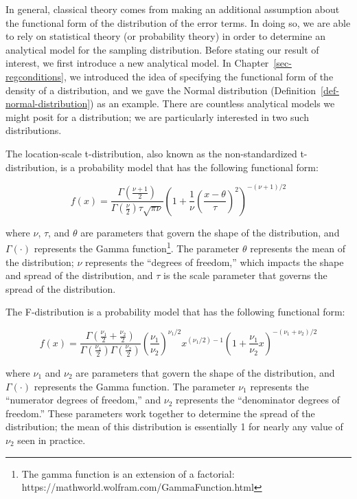 \documentclass[
  letterpaper,
  DIV=11,
  numbers=noendperiod]{scrreprt}
\theoremstyle{definition}
\theoremstyle{definition}
\theoremstyle{plain}
\theoremstyle{remark}
\begin{document}
In general, classical theory comes from making an additional assumption
about the functional form of the distribution of the error terms. In
doing so, we are able to rely on statistical theory (or probability
theory) in order to determine an analytical model for the sampling
distribution. Before stating our result of interest, we first introduce
a new analytical model. In Chapter~\ref{sec-regconditions}, we
introduced the idea of specifying the functional form of the density of
a distribution, and we gave the Normal distribution
(Definition~\ref{def-normal-distribution}) as an example. There are
countless analytical models we might posit for a distribution; we are
particularly interested in two such distributions.

The location-scale t-distribution, also known as the non-standardized
t-distribution, is a probability model that has the following functional
form:

\[f(x) = \frac{\Gamma\left(\frac{\nu + 1}{2}\right)}{\Gamma\left(\frac{\nu}{2}\right) \tau \sqrt{\pi \nu}} \left(1 + \frac{1}{\nu}\left(\frac{x - \theta}{\tau}\right)^2\right)^{-(\nu + 1)/2}\]

where \(\nu\), \(\tau\), and \(\theta\) are parameters that govern the
shape of the distribution, and \(\Gamma(\cdot)\) represents the Gamma
function\footnote{The gamma function is an extension of a factorial:
  https://mathworld.wolfram.com/GammaFunction.html}. The parameter
\(\theta\) represents the mean of the distribution; \(\nu\) represents
the ``degrees of freedom,'' which impacts the shape and spread of the
distribution, and \(\tau\) is the scale parameter that governs the
spread of the distribution.

The F-distribution is a probability model that has the following
functional form:

\[f(x) = \frac{\Gamma\left(\frac{\nu_1}{2} + \frac{\nu_2}{2}\right)}{\Gamma\left(\frac{\nu_1}{2}\right)\Gamma\left(\frac{\nu_2}{2}\right)} \left(\frac{\nu_1}{\nu_2}\right)^{\nu_1/2} x^{\left(\nu_1/2\right)-1} \left(1 + \frac{\nu_1}{\nu_2}x\right)^{-\left(\nu_1 + \nu_2\right)/2}\]

where \(\nu_1\) and \(\nu_2\) are parameters that govern the shape of
the distribution, and \(\Gamma(\cdot)\) represents the Gamma function.
The parameter \(\nu_1\) represents the ``numerator degrees of freedom,''
and \(\nu_2\) represents the ``denominator degrees of freedom.'' These
parameters work together to determine the spread of the distribution;
the mean of this distribution is essentially 1 for nearly any value of
\(\nu_2\) seen in practice.
\end{document}
